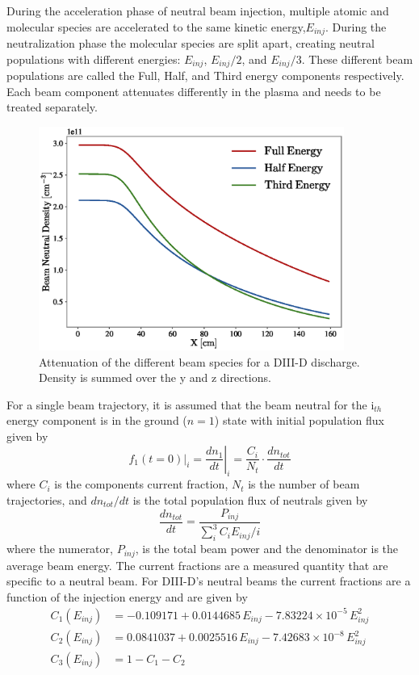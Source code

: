 During the acceleration phase of neutral beam injection, multiple atomic and molecular species are accelerated to the same kinetic energy,$E_{inj}$. During the neutralization phase the molecular species are split apart, creating neutral populations with different energies: $E_{inj}$, $E_{inj}/2$, and $E_{inj}/3$. These different beam populations are called the Full, Half, and Third energy components respectively.
Each beam component attenuates differently in the plasma and needs to be treated separately.
\begin{figure}[h!]
    \centering
    \includegraphics[width=10cm]{figures/beam_attenuation.eps}
    \caption{Attenuation of the different beam species for a DIII-D discharge. Density is summed over the y and z directions.}
    \label{fig:beam_attenuation}
\end{figure}
For a single beam trajectory, it is assumed that the beam neutral for the i$_{th}$ energy component is in the ground ($n=1$) state with initial population flux given by
\begin{equation}\label{eq:nb_flux}
    f_1(t=0)|_i = \left. \frac{d n_1}{dt}\right\rvert_i = \frac{C_i}{N_t} \cdot \frac{d n_{tot}}{dt}
\end{equation}
where $C_i$ is the components current fraction, $N_t$ is the number of beam trajectories, and $dn_{tot}/dt$ is the total population flux of neutrals given by
\begin{equation}\label{eq:tot_flux}
    \frac{d n_{tot}}{dt} = \frac{P_{inj}}{\sum_i^3 C_i E_{inj}/i}
\end{equation}
where the numerator, $P_{inj}$, is the total beam power and the denominator is the average beam energy.
The current fractions are a measured quantity that are specific to a neutral beam. For DIII-D's neutral beams the current fractions are a function of the injection energy and are given by
\begin{equation}\label{eq:d3d_cfracs}
\begin{split}
    C_{1}(E_{inj}) &= -0.109171 + 0.0144685\, E_{inj} - 7.83224\times10^{-5}\, E_{inj}^2 \\
    C_{2}(E_{inj}) &= 0.0841037 + 0.0025516\, E_{inj} - 7.42683\times10^{-8}\, E_{inj}^2 \\
    C_{3}(E_{inj}) &= 1 - C_{1} - C_{2}
\end{split}
\end{equation}

